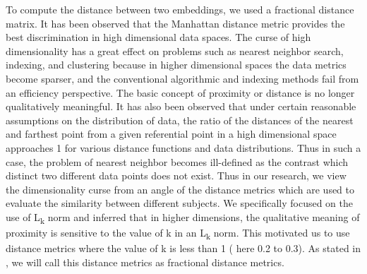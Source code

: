 \documentclass[10pt,twocolumn,letterpaper]{article}
\begin{document}
To compute the distance between two embeddings, we used a fractional distance matrix. It has been observed that the Manhattan distance metric provides the best discrimination in high dimensional data spaces. The curse of high dimensionality has a great effect on problems such as nearest neighbor search, indexing, and clustering because in higher dimensional spaces the data metrics become sparser, and the conventional algorithmic and indexing methods fail from an efficiency perspective. The basic concept of proximity or distance is no longer qualitatively meaningful. It has also been observed that under certain reasonable assumptions on the distribution of data, the ratio of the distances of the nearest and farthest point from a given referential point in a high dimensional space approaches 1 for various distance functions and data distributions. Thus in such a case, the problem of nearest neighbor becomes ill-defined as the contrast which distinct two different data points does not exist. Thus in our research, we view the dimensionality curse from an angle of the distance metrics which are used to evaluate the similarity between different subjects. We specifically focused on the use of L\textsubscript{k} norm and inferred that in higher dimensions, the qualitative meaning of proximity is sensitive to the value of k in an L\textsubscript{k} norm. This motivated us to use distance metrics where the value of k is less than 1 ( here 0.2 to 0.3). As stated in \cite{c3}, we will call this distance metrics as fractional distance metrics.
\end{document}

